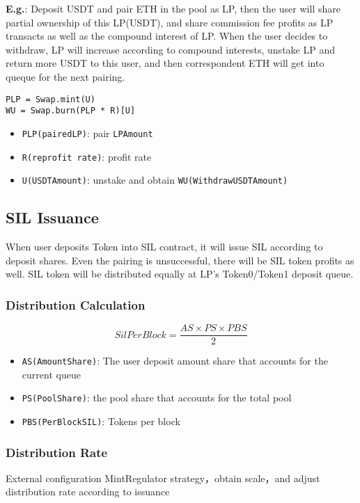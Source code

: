 \documentclass[11pt,letterpaper]{article}
\begin{document}
\begin{multicols}{2}
\textbf{E.g.}: Deposit USDT and pair ETH in the pool as LP, then the user will share partial ownership of this LP(USDT), and share commission fee profits as LP transacts as well as the compound interest of LP. When the user decides to withdraw, LP will increase according to compound interests, unstake LP and return more USDT to this user, and then correspondent ETH will get into queque for the next pairing.

\begin{verbatim}
PLP = Swap.mint(U)
WU = Swap.burn(PLP * R)[U]
\end{verbatim}
\begin{itemize}
    \item \texttt{PLP(pairedLP)}: pair \texttt{LPAmount}
    \item \texttt{R(reprofit rate)}: profit rate
    \item \texttt{U(USDTAmount)}: unstake and obtain \texttt{WU(WithdrawUSDTAmount)}
\end{itemize}

\subsection{SIL Issuance}
When user deposits Token into SIL contract, it will issue SIL according to deposit shares. Even the pairing is unsuccessful, there will be SIL token profits as well. SIL token will be distributed equally at LP's Token0/Token1 deposit queue.

\subsubsection{Distribution Calculation}
\[ SilPerBlock = \frac{AS \times PS \times PBS}{2} \]
\begin{itemize}
    \item \texttt{AS(AmountShare)}: The user deposit amount share that accounts for the current queue
    \item \texttt{PS(PoolShare)}: the pool share that accounts for the total pool
    \item \texttt{PBS(PerBlockSIL)}: Tokens per block
\end{itemize}

\subsubsection{Distribution Rate}
External configuration MintRegulator strategy，obtain scale，and adjust distribution rate according to issuance


\end{multicols}
\end{document}
